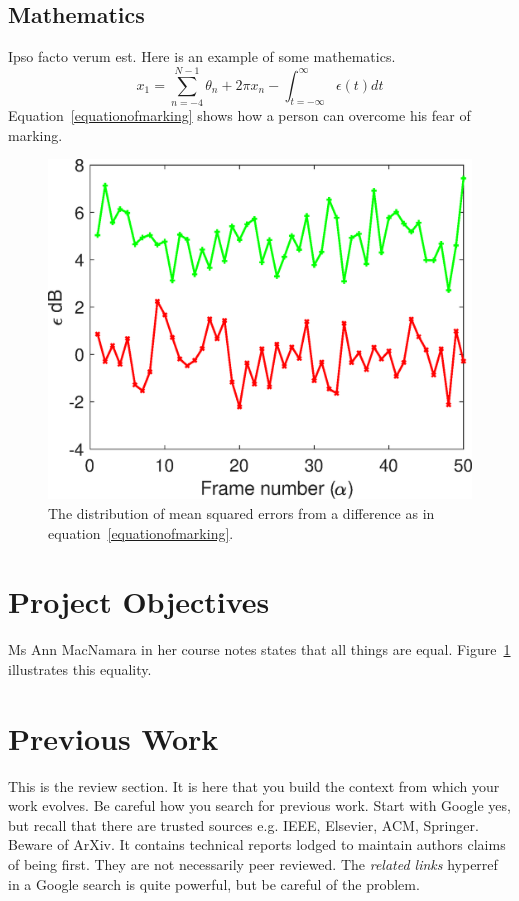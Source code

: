 \documentclass[11pt, a4paper]{article}
\begin{document}
\subsection{Mathematics}
Ipso facto verum est. Here is an example of some mathematics.
\begin{equation}
    x_1 = \sum_{n=-4}^{N-1} \theta_n + 2\pi x_n - \int_{t=-\infty}^{\infty} \epsilon(t) dt \label{equationofmarking}
\end{equation}
Equation~\ref{equationofmarking} shows how a person can overcome his fear of marking.
\begin{figure}
  \begin{center}
  \includegraphics[width=0.7\linewidth]{alineplot.eps}
  \end{center}
  \caption{The distribution of mean squared errors from a difference as in equation~\ref{equationofmarking}. \label{bars}}
  \caprule %
  \end{figure}
\section{Project Objectives}
Ms Ann MacNamara in her course notes \cite{schafer_1996} states that all things are equal. Figure~\ref{bars} illustrates this equality.

\section{Previous Work}
This is the review section. It is here that you build the context from which your work evolves.
Be careful how you search for previous work. Start with Google yes, but recall that there are trusted sources e.g. IEEE, Elsevier, ACM, Springer. Beware of ArXiv. It contains technical reports lodged to maintain authors claims of being first. They are not necessarily peer reviewed. The {\em related links} hyperref in a Google search is quite powerful, but be careful of the  problem.
\end{document}
